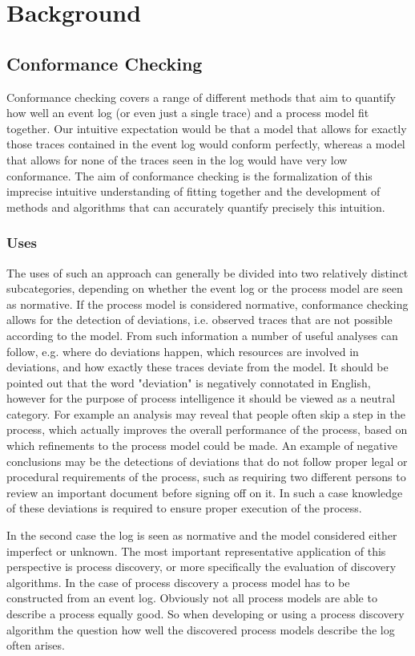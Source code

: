 \documentclass[runningheads]{template/llncs}
\begin{document}
\section{Background}
\subsection{Conformance Checking}
Conformance checking covers a range of different methods that aim to quantify how well an event log (or even just a single trace) and a process model fit together.
Our intuitive expectation would be that a model that allows for exactly those traces contained in the event log would conform perfectly, whereas a model that allows for none of the traces seen in the log would have very low conformance.
The aim of conformance checking is the formalization of this imprecise intuitive understanding of fitting together and the development of methods and algorithms that can accurately quantify precisely this intuition.

\subsubsection{Uses}
The uses of such an approach can generally be divided into two relatively distinct subcategories, depending on whether the event log or the process model are seen as normative.
If the process model is considered normative, conformance checking allows for the detection of deviations, i.e. observed traces that are not possible according to the model.
From such information a number of useful analyses can follow, e.g. where do deviations happen, which resources are involved in deviations, and how exactly these traces deviate from the model.
It should be pointed out that the word "deviation" is negatively connotated in English, however for the purpose of process intelligence it should be viewed as a neutral category. 
For example an analysis may reveal that people often skip a step in the process, which actually improves the overall performance of the process, based on which refinements to the process model could be made.
An example of negative conclusions may be the detections of deviations that do not follow proper legal or procedural requirements of the process, such as requiring two different persons to review an important document before signing off on it. In such a case knowledge of these deviations is required to ensure proper execution of the process.

In the second case the log is seen as normative and the model considered either imperfect or unknown.
The most important representative application of this perspective is process discovery, or more specifically the evaluation of discovery algorithms.
In the case of process discovery a process model has to be constructed from an event log.
Obviously not all process models are able to describe a process equally good.
So when developing or using a process discovery algorithm the question how well the discovered process models describe the log often arises.
\end{document}
